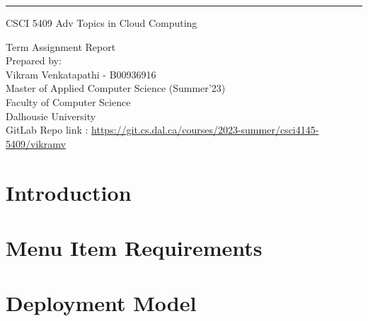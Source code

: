 \documentclass{scrreprt}
\date{\today}
\begin{document}
\begin{center}
  \rule{17cm}{5pt}\vskip1cm
  \begin{bfseries}
    \Large{CSCI 5409 Adv Topics in Cloud Computing}\\
    \vspace{1.5cm}

    \vspace{1.5cm}

    \vspace{1.5cm}
    \Huge{Term Assignment Report}\\
    \vspace{1.5cm}
    \LARGE{Prepared by: \\Vikram Venkatapathi - B00936916\\}
    \vspace{1.5cm}
    \vspace{1.5cm}
    \Large{Master of Applied Computer Science (Summer'23)\\
      Faculty of Computer Science\\
      Dalhousie University\\
      \vspace{3cm}
      GitLab Repo link : \url{https://git.cs.dal.ca/courses/2023-summer/csci4145-5409/vikramv}
    }
  \end{bfseries}
\end{center}



\newpage
{}

\newpage
{}
{}
\tableofcontents
\newpage
{}



\newpage
{}

\part{Introduction}


\part{Menu Item Requirements}


\part{ Deployment Model }

\end{document}
